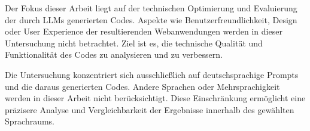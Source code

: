 Der Fokus dieser Arbeit liegt auf der technischen Optimierung und Evaluierung der durch LLMs generierten Codes. Aspekte wie Benutzerfreundlichkeit, Design oder User Experience der resultierenden Webanwendungen werden in dieser Untersuchung nicht betrachtet. Ziel ist es, die technische Qualität und Funktionalität des Codes zu analysieren und zu verbessern.\vspace{0.2cm}

Die Untersuchung konzentriert sich ausschließlich auf deutschsprachige Prompts und die daraus generierten Codes. Andere Sprachen oder Mehrsprachigkeit werden in dieser Arbeit nicht berücksichtigt. Diese Einschränkung ermöglicht eine präzisere Analyse und Vergleichbarkeit der Ergebnisse innerhalb des gewählten Sprachraums.

